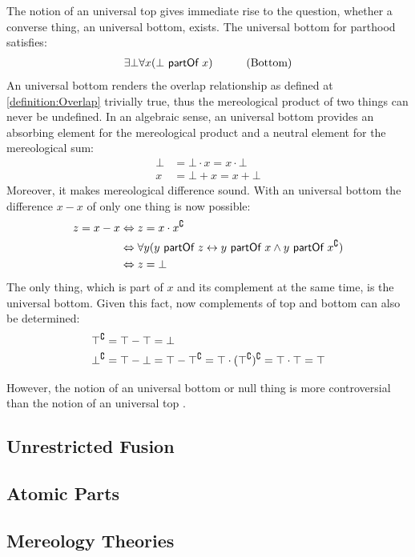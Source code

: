 The notion of an universal top gives immediate rise to the question, whether a converse thing, an universal bottom, exists.
The universal bottom for parthood satisfies:
\begin{align}
&\exists \bot \forall x (\bot ~\textsf{partOf}~ x)
&\qquad \text{(Bottom)}
\end{align}
An universal bottom renders the overlap relationship as defined at \ref{definition:Overlap} trivially true, thus the mereological product of two things can never be undefined.
In an algebraic sense, an universal bottom provides an absorbing element for the mereological product and a neutral element for the mereological sum:
\begin{align}
\bot &= \bot \cdot x = x \cdot \bot
\\
x &= \bot + x = x + \bot
\end{align}
Moreover, it makes mereological difference sound.
With an universal bottom the difference $x - x$ of only one thing is now possible:
\begin{align}
\begin{split}
z = x - x
&\Leftrightarrow
z = x \cdot x^{\complement}
\\&\Leftrightarrow
\forall y (y ~\textsf{partOf}~ z \leftrightarrow y ~\textsf{partOf}~ x \wedge y ~\textsf{partOf}~ x^{\complement})
\\&\Leftrightarrow
z = \bot
\end{split}
\end{align}
The only thing, which is part of $x$ and its complement at the same time, is the universal bottom.
Given this fact, now complements of top and bottom can also be determined:
\begin{align}
\top^{\complement}
&= \top - \top 
= \bot
\\
\bot^{\complement}
&= \top - \bot 
= \top - \top^{\complement} 
= \top \cdot (\top^{\complement})^{\complement}
= \top \cdot \top
= \top
\end{align}

However, the notion of an universal bottom or null thing is more controversial than the notion of an universal top \cite{DBLP:journals/dke/Varzi96}.



\subsection{Unrestricted Fusion}
\label{subsection:UnrestrictedFusion}

\subsection{Atomic Parts}
\label{subsection:AtomicParts}

\subsection{Mereology Theories}
\label{subsection:MereologyTheories}